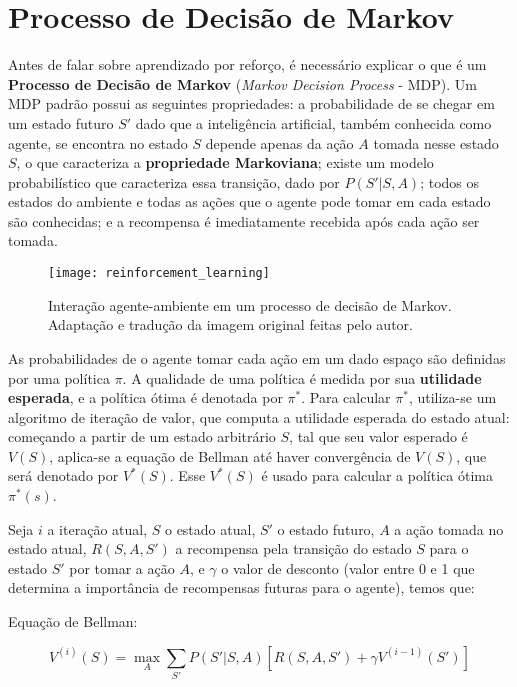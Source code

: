 
\section{Processo de Decisão de Markov}
\label{sec:mdp}

Antes de falar sobre aprendizado por reforço, é necessário explicar o que é um \textbf{Processo de Decisão de Markov} (\textit{Markov Decision Process} - MDP).
Um MDP padrão possui as seguintes propriedades:
a probabilidade de se chegar em um estado futuro $S'$ dado que a inteligência artificial, também conhecida como agente, se encontra no estado $S$ depende apenas da ação $A$ tomada nesse estado $S$, o que caracteriza a \textbf{propriedade Markoviana};
existe um modelo probabilístico que caracteriza essa transição, dado por $P(S'|S,A)$;
todos os estados do ambiente e todas as ações que o agente pode tomar em cada estado são conhecidas;
e a recompensa é imediatamente recebida após cada ação ser tomada.

\begin{figure}[h!]
\texttt{[image: reinforcement\_learning]}
\centering
\caption{Interação agente-ambiente em um processo de decisão de Markov\cite{sutton2018reinforcement}. Adaptação e tradução da imagem original feitas pelo autor.}
\end{figure}

As probabilidades de o agente tomar cada ação em um dado espaço são definidas por uma política $\pi$.
A qualidade de uma política é medida por sua \textbf{utilidade esperada}, e a política ótima é denotada por $\pi^{*}$.
Para calcular $\pi^{*}$, utiliza-se um algoritmo de iteração de valor, que computa a utilidade esperada do estado atual:
começando a partir de um estado arbitrário $S$, tal que seu valor esperado é $V(S)$, aplica-se a equação de Bellman até haver convergência de $V(S)$, que será denotado por $V^{*}(S)$.
Esse $V^{*}(S)$ é usado para calcular a política ótima $\pi^{*}(s)$.

Seja $i$ a iteração atual, $S$ o estado atual, $S'$ o estado futuro, $A$ a ação tomada no estado atual, $R(S,A,S')$ a recompensa pela transição do estado $S$ para o estado $S'$ por tomar a ação $A$, e $\gamma$ o valor de desconto (valor entre 0 e 1 que determina a importância de recompensas futuras para o agente), temos que:

Equação de Bellman:

\begin{equation} \label{eq:bellman}
V^{(i)}(S) = \max_{A}\sum_{S'}P(S'|S,A)[R(S,A,S') + \gamma V^{(i-1)}(S')]
\end{equation}

